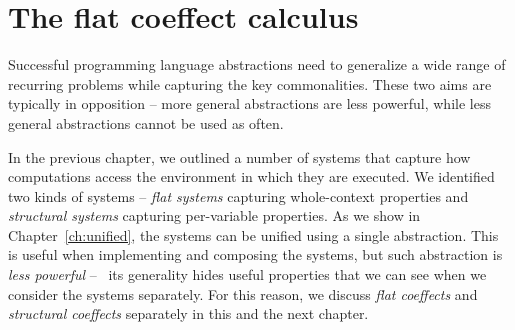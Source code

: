 


\chapter{The flat coeffect calculus} 
\label{ch:flat} 

Successful programming language abstractions need to generalize a wide range of recurring
problems while capturing the key commonalities. These two aims are typically in opposition -- 
more general abstractions are less powerful, while less general abstractions cannot be
used as often.

In the previous chapter, we outlined a number of systems that capture how computations
access the environment in which they are executed. We identified two kinds of systems --
\emph{flat systems} capturing whole-context properties and \emph{structural systems} capturing 
per-variable properties. As we show in Chapter~\ref{ch:unified}, the systems can be unified 
using a single abstraction. This is useful when implementing and composing the systems, but such 
abstraction is  \emph{less powerful} -- \ie~its generality hides useful properties that we can see 
when we consider the systems separately. For this reason, we discuss \emph{flat coeffects} and
\emph{structural coeffects} separately in this and the next chapter.

